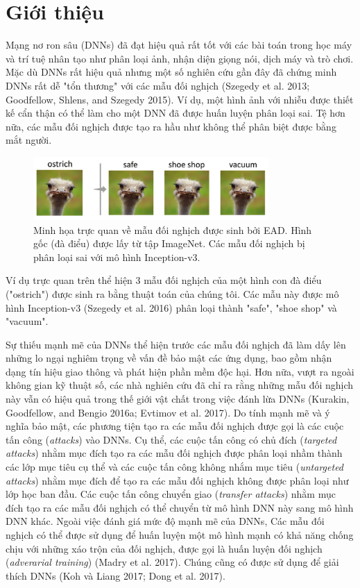 \chapter{Giới thiệu}
Mạng nơ ron sâu (DNNs) đã đạt hiệu quả rất tốt với các bài toán trong học máy
và trí tuệ nhân tạo như phân loại ảnh, nhận diện giọng nói, dịch máy và trò chơi.
Mặc dù DNNs rất hiệu quả nhưng một số nghiên cứu gần đây đã chứng minh DNNs rất 
dễ  "tổn thương" với các mẫu đối nghịch (Szegedy et al. 2013; Goodfellow, Shlens, 
and Szegedy 2015). Ví dụ, một hình ảnh với nhiễu được thiết kế cẩn thận có thể
làm cho một DNN đã được huấn luyện phân loại sai. Tệ hơn nữa, các mẫu đối nghịch
được tạo ra hầu như không thể phân biệt được bằng mắt người. 
\begin{figure}[H] %
    \centering %
    \includegraphics[width=0.8\textwidth]{assets/fig_01.png} 
    \caption{Minh họa trực quan về mẫu đối nghịch được sinh bởi EAD. 
    Hình gốc (đà điểu) được lấy từ tập ImageNet. Các mẫu đối nghịch bị 
    phân loại sai với mô hình Inception-v3.} %
    \label{fig:fg_01}
\end{figure}
Ví dụ trực quan trên thể hiện 3 mẫu đối nghịch của một hình con đà điểu ("ostrich") 
được sinh ra bằng thuật toán của chúng tôi. Các mẫu này được mô hình Inception-v3 
(Szegedy et al. 2016) phân loại thành "safe", "shoe shop" và "vacuum". 

Sự thiếu mạnh mẽ của DNNs thể hiện trước các mẫu đối nghịch đã làm dấy lên những lo ngại 
nghiêm trọng về vấn đề bảo mật các ứng dụng, bao gồm nhận dạng tín hiệu giao thông 
và phát hiện phần mềm độc hại. Hơn nữa, vượt ra ngoài không gian kỹ thuật số, 
các nhà nghiên cứu đã chỉ ra rằng những mẫu đối nghịch này vẫn có hiệu quả trong thế giới 
vật chất trong việc đánh lừa DNNs (Kurakin, Goodfellow, and Bengio 2016a; Evtimov et al. 2017).
Do tính mạnh mẽ và ý nghĩa bảo mật, các phương tiện tạo ra các mẫu đối nghịch được gọi là 
các cuộc tấn công (\textit{attacks}) vào DNNs. Cụ thể, các cuộc tấn công có chủ đích 
(\textit{targeted attacks}) nhằm mục đích tạo ra các mẫu đối nghịch được phân loại nhầm thành các lớp mục tiêu 
cụ thể và các cuộc tấn công không nhắm mục tiêu (\textit{untargeted attacks}) nhằm mục đích 
để tạo ra các mẫu đối nghịch không được phân loại như lớp học ban đầu. Các cuộc tấn công 
chuyển giao (\textit{transfer attacks}) nhằm mục đích tạo ra các mẫu đối nghịch có thể chuyển 
từ mô hình DNN này sang mô hình DNN khác. Ngoài việc đánh giá mức độ mạnh mẽ của DNNs,
Các mẫu đối nghịch có thể được sử dụng để huấn luyện một mô hình mạnh có khả năng chống chịu 
với những xáo trộn của đối nghịch, được gọi là huấn luyện đối nghịch (\textit{adverarial training}) 
(Madry et al. 2017). Chúng cũng có được sử dụng để giải thích DNNs (Koh và Liang 2017;
Dong et al. 2017). 

